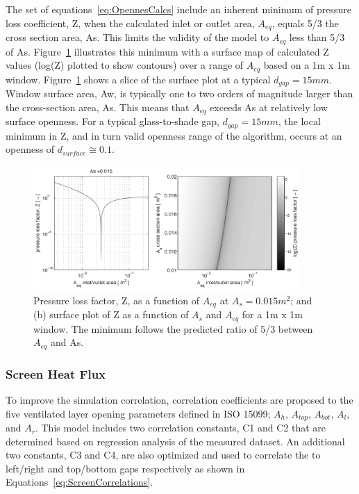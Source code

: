 The set of equations~\ref{eq:OpennesCalcs} include an inherent minimum of pressure loss coefficient, Z, when the calculated inlet or outlet area, $A_{eq}$, equals 5/3 the cross section area, As. This limits the validity of the model to $A_{eq}$ less than 5/3 of As. Figure~\ref{fig:PressureLossFacor} illustrates this minimum with a surface map of calculated Z values (log(Z) plotted to show contours) over a range of $A_{eq}$ based on a 1m x 1m window. Figure~\ref{fig:PressureLossFacor} shows a slice of the surface plot at a typical $d_{gap} = 15 mm$. Window surface area, Aw, is typically one to two orders of magnitude larger than the cross-section area, As. This means that $A_{eq}$ exceeds As at relatively low surface openness. For a typical glass-to-shade gap, $d_{gap} = 15mm$, the local minimum in Z, and in turn valid openness range of the algorithm, occurs at an openness of $d_{surface} \cong 0.1$.

\begin{figure}[hbtp]
	\centering
	\includegraphics[width=0.9\textwidth, height=0.9\textheight, keepaspectratio=true]{media/PressureLossFactor.png}
	\caption{Pressure loss factor, Z, as a function of $A_{eq}$ at $A_s = 0.015m^2$; and (b) surface plot of Z as a function of $A_s$ and $A_{eq}$ for a 1m x 1m window. The minimum follows the predicted ratio of 5/3 between $A_{eq}$ and As. \protect \label{fig:PressureLossFacor}}
\end{figure}

\subsubsection{Screen Heat Flux}
To improve the simulation correlation, correlation coefficients are proposed to the five ventilated layer opening parameters defined in ISO 15099; $A_h$, $A_{top}$, $A_{bot}$, $A_l$, and $A_r$. This model includes two correlation constants, C1 and C2 that are determined based on regression analysis of the measured dataset. An additional two constants, C3 and C4, are also optimized and used to correlate the to left/right and top/bottom gaps respectively as shown in Equations~\ref{eq:ScreenCorrelations}. 

